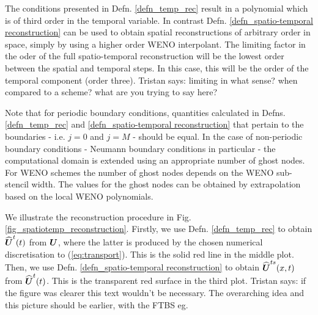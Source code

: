 \documentclass[final]{amsart}
\renewcommand{\vect}[1]{\geovec{#1}}
\newcommand{\tristan}[1]{{\color{purple} Tristan says:  #1 }}
\numberwithin{equation}{section}
\begin{document}
\begin{Rem}
  The conditions presented in Defn. \ref{defn_temp_rec} result in a
  polynomial which is of third order in the temporal variable.  In
  contrast Defn. \ref{defn_spatio-temporal reconstruction} can be used
  to obtain spatial reconstructions of arbitrary order in space,
  simply by using a higher order WENO interpolant.  The limiting
  factor in the oder of the full spatio-temporal reconstruction will
  be the lowest order between the spatial and temporal steps.  In this
  case, this will be the order of the temporal component (order
  three). \tristan{limiting in what sense? when compared to a scheme?
    what are you trying to say here?}
\end{Rem}

\begin{Rem}
  Note that for periodic boundary conditions, quantities calculated in
Defns. \ref{defn_temp_rec} and \ref{defn_spatio-temporal
  reconstruction} that pertain to the boundaries - i.e. $j=0$ and
$j=M$ - should be equal.  In the case of non-periodic boundary
conditions - Neumann boundary conditions in particular - the
computational domain is extended using an appropriate number of ghost
nodes.  For WENO schemes the number of ghost nodes depends on the WENO
sub-stencil width.  The values for the ghost nodes can be obtained by
extrapolation based on the local WENO polynomials.
\end{Rem}
 
We illustrate the reconstruction procedure in
Fig. \ref{fig_spatiotemp_reconstruction}.  Firstly, we use
Defn. \ref{defn_temp_rec} to obtain $\widehat{\vect {U}}^t\qp{t}$ from
$\vect{U}$, where the latter is produced by the chosen numerical
discretisation to (\ref{eq:transport}).  This is the solid red line in
the middle plot.  Then, we use Defn. \ref{defn_spatio-temporal
  reconstruction} to obtain $\widehat{\vect {U}}^{ts}\qp{x,t}$ from
$\widehat{\vect {U}}^{t}\qp{t}$.  This is the transparent red surface
in the third plot. \tristan{if the figure was clearer this text
  wouldn't be necessary. The overarching idea and this picture should
  be earlier, with the FTBS eg.}
\end{document}
